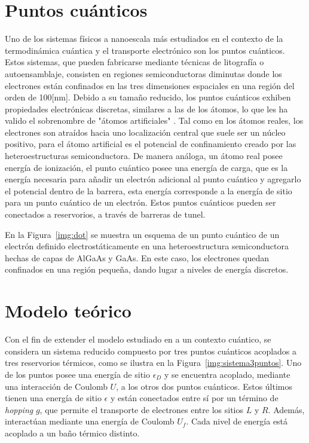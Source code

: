 \section{Puntos cuánticos}
Uno de los sistemas físicos a nanoescala más estudiados en el contexto de la termodinámica cuántica y el transporte electrónico son los puntos cuánticos. Estos sistemas, que pueden fabricarse mediante técnicas de litografía o autoensamblaje, consisten en regiones semiconductoras diminutas donde los electrones están confinados en las tres dimensiones espaciales en una región del orden de 100[nm]\cite{hanson2007spins}. Debido a su tamaño reducido, los puntos cuánticos exhiben propiedades electrónicas discretas, similares a las de los átomos, lo que les ha valido el sobrenombre de "átomos artificiales" \cite{kouwenhoven2001few}. Tal como en los átomos reales, los electrones son atraídos hacia uno localización central que suele ser un núcleo positivo, para el átomo artificial es el potencial de confinamiento creado por las heteroestructuras semiconductora\cite{ashoori1996electrons}. De manera análoga, un átomo real posee energía de ionización, el punto cuántico posee una energía de carga, que es la energía necesaria para añadir un electrón adicional al punto cuántico y agregarlo el potencial dentro de la barrera, esta energía corresponde a la energía de sitio para un punto cuántico de un electrón. Estos puntos cuánticos pueden ser conectados a reservorios, a través de barreras de tunel.

En la Figura~\ref{img:dot} se muestra un esquema de un punto cuántico de un electrón definido electrostáticamente en una heteroestructura semiconductora hechas de capas de AlGaAs y GaAs. En este caso, los electrones quedan confinados en una región pequeña, dando lugar a niveles de energía discretos.


\section{Modelo teórico}

Con el fin de extender el modelo estudiado en \cite{horowitz2014thermodynamics} a un contexto cuántico, se considera un sistema reducido compuesto por tres puntos cuánticos acoplados a tres reservorios térmicos, como se ilustra en la Figura~\ref{img:sistema3puntos}. Uno de los puntos posee una energía de sitio $\epsilon_D$ y se encuentra acoplado, mediante una interacción de Coulomb $U$, a los otros dos puntos cuánticos. Estos últimos tienen una energía de sitio $\epsilon$ y están conectados entre sí por un término de \textit{hopping} $g$, que permite el transporte de electrones entre los sitios $L$ y $R$. Además, interactúan mediante una energía de Coulomb $U_f$. Cada nivel de energía está acoplado a un baño térmico distinto. 

